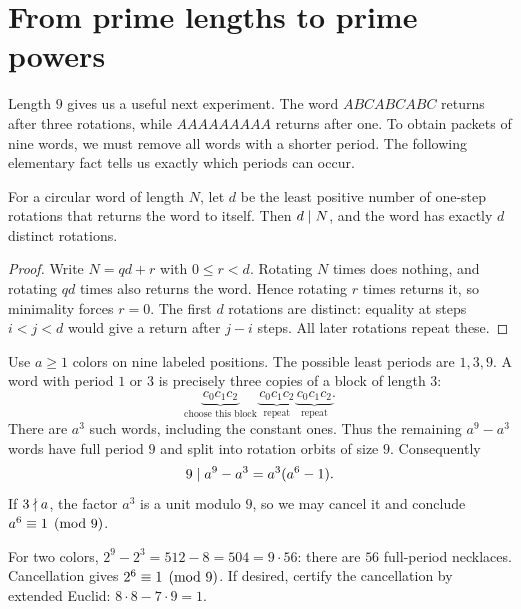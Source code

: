 \section{From prime lengths to prime powers}
\label{sec:euler-necklaces}

Length $9$ gives us a useful next experiment. The word $ABCABCABC$
returns after three rotations, while $AAAAAAAAA$ returns after one.
To obtain packets of nine words, we must remove all words with a shorter
period. The following elementary fact tells us exactly which periods
can occur.

\begin{lemma}
For a circular word of length $N$, let $d$ be the least positive number
of one-step rotations that returns the word to itself. Then $d\mid N$,
and the word has exactly $d$ distinct rotations.
\end{lemma}
\begin{proof}
Write $N=qd+r$ with $0\le r<d$. Rotating $N$ times does nothing, and
rotating $qd$ times also returns the word. Hence rotating $r$ times
returns it, so minimality forces $r=0$.
The first $d$ rotations are distinct: equality at steps $i<j<d$ would
give a return after $j-i$ steps. All later rotations repeat these.
\end{proof}

\begin{example}
Use $a\ge1$ colors on nine labeled positions. The possible least
periods are $1,3,9$. A word with period $1$ or $3$ is precisely three
copies of a block of length $3$:
\[
 \underbrace{c_0c_1c_2}_{\text{choose this block}}\,
 \underbrace{c_0c_1c_2}_{\text{repeat}}\,
 \underbrace{c_0c_1c_2}_{\text{repeat}}.
\]
There are $a^3$ such words, including the constant ones. Thus the
remaining $a^9-a^3$ words have full period $9$ and split into rotation
orbits of size $9$. Consequently
\[
 9\mid a^9-a^3=a^3(a^6-1).
\]
If $3\nmid a$, the factor $a^3$ is a unit modulo $9$, so we may
cancel it and conclude $a^6\equiv1\pmod9$.

For two colors, $2^9-2^3=512-8=504=9\cdot56$: there are $56$
full-period necklaces. Cancellation gives $2^6\equiv1\pmod9$.
If desired, certify the cancellation by extended Euclid:
$8\cdot8-7\cdot9=1$.
\end{example}

